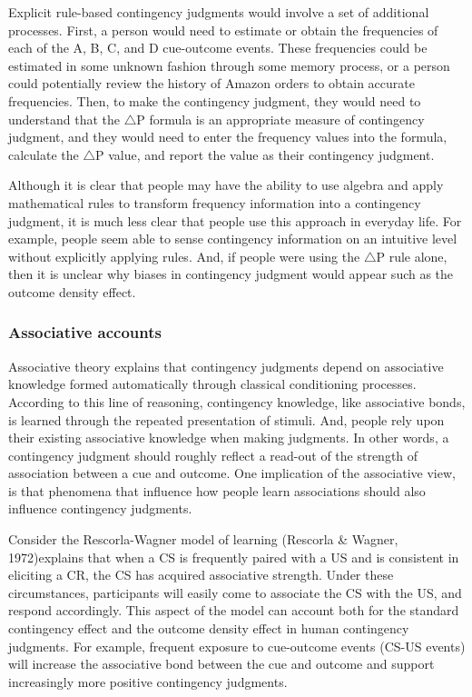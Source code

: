 \documentclass[
  english,
  man,floatsintext]{apa6}
\begin{document}
Explicit rule-based contingency judgments would involve a set of additional processes. First, a person would need to estimate or obtain the frequencies of each of the A, B, C, and D cue-outcome events. These frequencies could be estimated in some unknown fashion through some memory process, or a person could potentially review the history of Amazon orders to obtain accurate frequencies. Then, to make the contingency judgment, they would need to understand that the \(\triangle\)P formula is an appropriate measure of contingency judgment, and they would need to enter the frequency values into the formula, calculate the \(\triangle\)P value, and report the value as their contingency judgment.

Although it is clear that people may have the ability to use algebra and apply mathematical rules to transform frequency information into a contingency judgment, it is much less clear that people use this approach in everyday life. For example, people seem able to sense contingency information on an intuitive level without explicitly applying rules. And, if people were using the \(\triangle\)P rule alone, then it is unclear why biases in contingency judgment would appear such as the outcome density effect.

\hypertarget{associative-accounts}{%
\subsubsection{Associative accounts}\label{associative-accounts}}

Associative theory explains that contingency judgments depend on associative knowledge formed automatically through classical conditioning processes. According to this line of reasoning, contingency knowledge, like associative bonds, is learned through the repeated presentation of stimuli. And, people rely upon their existing associative knowledge when making judgments. In other words, a contingency judgment should roughly reflect a read-out of the strength of association between a cue and outcome. One implication of the associative view, is that phenomena that influence how people learn associations should also influence contingency judgments.

Consider the Rescorla-Wagner model of learning (Rescorla \& Wagner, 1972)explains that when a CS is frequently paired with a US and is consistent in eliciting a CR, the CS has acquired associative strength. Under these circumstances, participants will easily come to associate the CS with the US, and respond accordingly. This aspect of the model can account both for the standard contingency effect and the outcome density effect in human contingency judgments. For example, frequent exposure to cue-outcome events (CS-US events) will increase the associative bond between the cue and outcome and support increasingly more positive contingency judgments.
\end{document}
